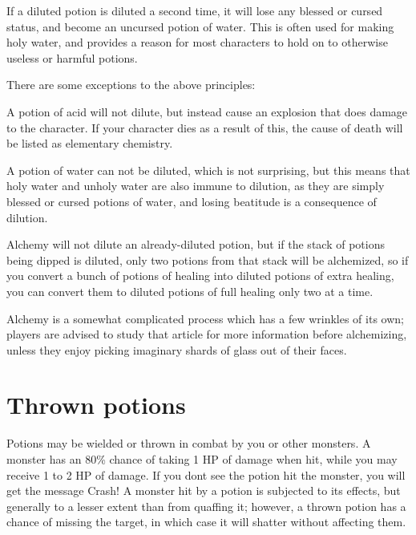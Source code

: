 If a diluted potion is diluted a second time, it will lose any blessed or cursed status, and become an uncursed potion of water. This is often used for making holy water, and provides a reason for most characters to hold on to otherwise useless or harmful potions.


There are some exceptions to the above principles:




\begin{myitemize}\item{}A potion of acid will not dilute, but instead cause an explosion that does damage to the character. If your character dies as a result of this, the cause of death will be listed as elementary chemistry.
\item{}A potion of water can not be diluted, which is not surprising, but this means that holy water and unholy water are also immune to dilution, as they are simply blessed or cursed potions of water, and losing beatitude is a consequence of dilution.
\item{}Alchemy will not dilute an already-{}diluted potion, but if the stack of potions being dipped is diluted, only two potions from that stack will be alchemized, so if you convert a bunch of potions of healing into diluted potions of extra healing, you can convert them to diluted potions of full healing only two at a time.
\end{myitemize}

Alchemy\footnotemark[248] is a somewhat complicated process which has a few wrinkles of its own; players are advised to study that article for more information before alchemizing, unless they enjoy picking imaginary shards of glass out of their faces.



\section{Thrown potions}
\label{13}
Potions may be wielded\footnotemark[249] or thrown\footnotemark[250] in combat by you or other monsters. A monster has an 80\% chance of taking 1 HP of damage when hit, while you may receive 1 to 2 HP of damage. If you don\textquotesingle{}t see the potion hit the monster, you will get the message Crash! A monster hit by a potion is subjected to its effects, but generally to a lesser extent than from quaffing it; however, a thrown potion has a chance of missing the target, in which case it will shatter without affecting them.


